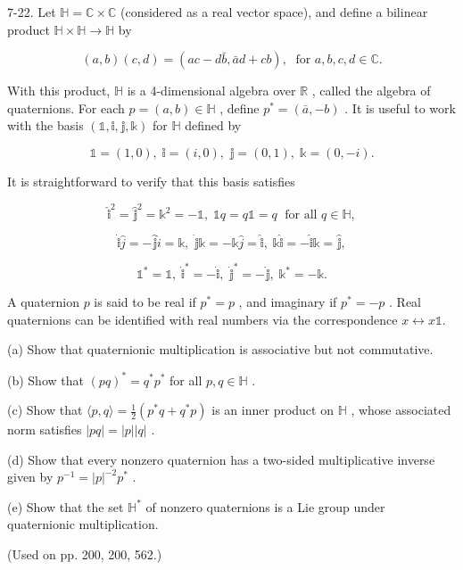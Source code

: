\begin{exercise}
\label{prob:7-22}


7-22. Let $\mathbb{H} = \mathbb{C} \times  \mathbb{C}$ (considered as a real vector space), and define a bilinear product $\mathbb{H} \times  \mathbb{H} \rightarrow  \mathbb{H}$ by

\[
\left( {a, b}\right) \left( {c, d}\right)  = \left( {{ac} - d\bar{b},\bar{a}d + {cb}}\right) ,\;\text{ for }a, b, c, d \in  \mathbb{C}.
\]

With this product, $\mathbb{H}$ is a 4-dimensional algebra over $\mathbb{R}$ , called the algebra of quaternions. For each $p = \left( {a, b}\right)  \in  \mathbb{H}$ , define ${p}^{ * } = \left( {\bar{a}, - b}\right)$ . It is useful to work with the basis $\left( {\mathbb{1},\mathbb{i},\mathbb{j},\mathbb{k}}\right)$ for $\mathbb{H}$ defined by

\[
\mathbb{1} = \left( {1,0}\right) ,\;\mathbb{i} = \left( {i,0}\right) ,\;\mathbb{j} = \left( {0,1}\right) ,\;\mathbb{k} = \left( {0, - i}\right) .
\]

It is straightforward to verify that this basis satisfies

\[
{\widehat{\mathbb{i}}}^{2} = {\widehat{\mathbb{j}}}^{2} = {\mathbb{k}}^{2} =  - \mathbb{1},\;\mathbb{1}q = q\mathbb{1} = q\;\text{ for all }q \in  \mathbb{H},
\]

\[
\dot{\mathbb{i}}\widehat{j} =  - \widehat{\mathbb{j}}\widehat{i} = \mathbb{k},\;\dot{\mathbb{j}}\mathbb{k} =  - \mathbb{k}\widehat{j} = \widehat{\mathbb{i}},\;\mathbb{k}\widehat{\mathbb{i}} =  - \widehat{\mathbb{i}}\mathbb{k} = \widehat{\mathbb{j}},
\]

\[
{\mathbb{1}}^{ * } = \mathbb{1},\;{\dot{\mathbb{i}}}^{ * } =  - \dot{\mathbb{i}},\;{\dot{\mathbb{j}}}^{ * } =  - \dot{\mathbb{j}},\;{\mathbb{k}}^{ * } =  - \mathbb{k}.
\]

A quaternion $p$ is said to be real if ${p}^{ * } = p$ , and imaginary if ${p}^{ * } =  - p$ . Real quaternions can be identified with real numbers via the correspondence $x \leftrightarrow  x\mathbb{1}.$

(a) Show that quaternionic multiplication is associative but not commutative.

(b) Show that ${\left( pq\right) }^{ * } = {q}^{ * }{p}^{ * }$ for all $p, q \in  \mathbb{H}$ .

(c) Show that $\langle p, q\rangle  = \frac{1}{2}\left( {{p}^{ * }q + {q}^{ * }p}\right)$ is an inner product on $\mathbb{H}$ , whose associated norm satisfies $\left| {pq}\right|  = \left| p\right| \left| q\right|$ .

(d) Show that every nonzero quaternion has a two-sided multiplicative inverse given by ${p}^{-1} = {\left| p\right| }^{-2}{p}^{ * }$ .

(e) Show that the set ${\mathbb{H}}^{ * }$ of nonzero quaternions is a Lie group under quaternionic multiplication.

(Used on pp. 200, 200, 562.)
\end{exercise}

